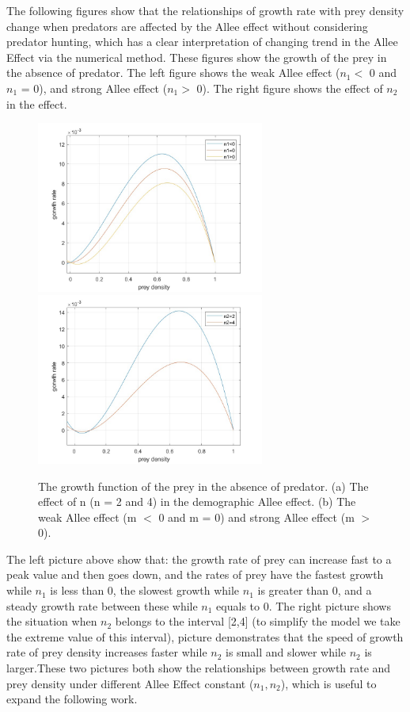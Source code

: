 \documentclass[12pt]{article}
\begin{document}
\noindent The following figures show that the relationships of growth rate with prey density change when predators are affected by the Allee effect without considering predator hunting, which has a clear interpretation of changing trend in the Allee Effect via the numerical method. These figures show the growth of the prey in the absence of predator. The left figure shows the weak Allee effect ($n_1<$ 0 and $n
_1$ = 0), and strong Allee effect ($n_1>$ 0). The right figure shows the effect of $n_2$ in the effect.
\vspace{12pt}
\begin{figure}[H]
\centering
\includegraphics[width=7.5cm]{Allee1.jpg}
\includegraphics[width=7.5cm]{Allee2.jpg}
\caption{\scriptsize{The growth function of the prey in the absence of predator. (a) The effect of n (n = 2 and 4) in the demographic Allee effect. (b) The weak Allee effect (m $<$ 0 and m = 0) and strong Allee effect (m $>$
 0).}}
\label{fig:my_label}
\end{figure}
\vspace{12pt}
\noindent The left picture above show that: the growth rate of prey can increase fast to a peak value and then goes down, and the rates of prey have the fastest growth while $n_1$ is less than 0, the slowest growth while $n_1$ is greater than 0, and a steady growth rate between these while $n_1$ equals to 0. The right picture shows the situation when $n_2$ belongs to the interval [2,4] (to simplify the model we take the extreme value of this interval), picture demonstrates that the speed of growth rate of prey density increases faster while $n_2$ is small and slower while $n_2$ is larger.These two pictures both show the relationships between growth rate and prey density under different Allee Effect constant ($n_1, n_2$), which is useful to expand the following work.
\vspace{24pt}
\end{document}
